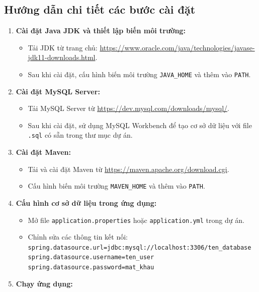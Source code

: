 \documentclass{article}
\begin{document}
\subsection{Hướng dẫn chi tiết các bước cài đặt}
\begin{enumerate}
    \item \textbf{Cài đặt Java JDK và thiết lập biến môi trường:}
    \begin{itemize}
        \item Tải JDK từ trang chủ: \href{https://www.oracle.com/java/technologies/javase-jdk11-downloads.html}{https://www.oracle.com/java/technologies/javase-jdk11-downloads.html}.
        \item Sau khi cài đặt, cấu hình biến môi trường \verb|JAVA_HOME| và thêm vào \verb|PATH|.
    \end{itemize}
    \item \textbf{Cài đặt MySQL Server:}
    \begin{itemize}
        \item Tải MySQL Server từ \href{https://dev.mysql.com/downloads/mysql/}{https://dev.mysql.com/downloads/mysql/}.
        \item Sau khi cài đặt, sử dụng MySQL Workbench để tạo cơ sở dữ liệu với file \verb|.sql| có sẵn trong thư mục dự án.
    \end{itemize}
    \item \textbf{Cài đặt Maven:}
    \begin{itemize}
        \item Tải và cài đặt Maven từ \href{https://maven.apache.org/download.cgi}{https://maven.apache.org/download.cgi}.
        \item Cấu hình biến môi trường \verb|MAVEN_HOME| và thêm vào \verb|PATH|.
    \end{itemize}
    \item \textbf{Cấu hình cơ sở dữ liệu trong ứng dụng:}
    \begin{itemize}
        \item Mở file \verb|application.properties| hoặc \verb|application.yml| trong dự án.
        \item Chỉnh sửa các thông tin kết nối:\\
    \verb|spring.datasource.url=jdbc:mysql://localhost:3306/ten_database|
    \verb|spring.datasource.username=ten_user|\\
    \verb|spring.datasource.password=mat_khau|
    \end{itemize}
    \item \textbf{Chạy ứng dụng:}

\end{enumerate}
\end{document}
